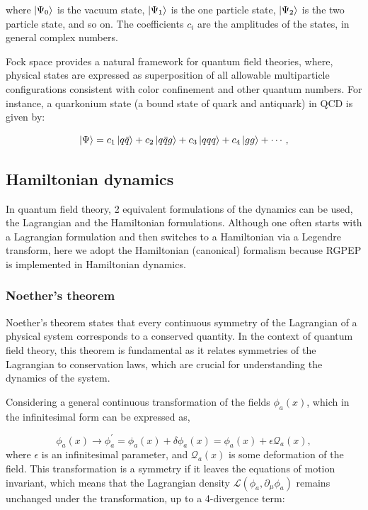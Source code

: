 \documentclass[11pt,a4paper,twoside,pdf]{article}
\numberwithin{equation}{section}
\begin{document}
where $\ket{\Psi_0}$ is the vacuum state, $\ket{\Psi_1}$ is the one particle
state, $\ket{\Psi_2}$ is the two particle state, and so on. The coefficients $c_i$
are the amplitudes of the states, in general complex numbers. 

Fock space provides a natural framework for quantum field theories, where, 
physical states are expressed as superposition of all allowable multiparticle 
configurations consistent with color confinement and other quantum numbers. 
For instance, a quarkonium state (a bound state of quark and antiquark) in QCD is 
given by:

\begin{equation}
    \ket{\Psi} = c_1 \ket{q\bar{q}} + c_2 \ket{q\bar{q}g} + c_3 \ket{qqq} 
    + c_4 \ket{gg} + \cdots,
\end{equation}

\subsection{Hamiltonian dynamics}

In quantum field theory, 2 equivalent formulations of the dynamics can be used, 
the Lagrangian and the Hamiltonian formulations. Although one often starts with a 
Lagrangian formulation and then switches to a Hamiltonian via a Legendre transform, 
here we adopt the Hamiltonian (canonical) formalism because RGPEP is implemented 
in Hamiltonian dynamics.

\subsubsection{Noether's theorem}

Noether's theorem \cite{Noether:1918zz} states that every continuous symmetry of the
Lagrangian of a physical system corresponds to a conserved quantity. In the context
of quantum field theory, this theorem is fundamental as it relates symmetries of the
Lagrangian to conservation laws, which are crucial for understanding the dynamics of
the system.

Considering a general continuous transformation of the fields \(\phi_a(x)\), 
which in the infinitesimal form can be expressed as,

\begin{equation}
    \phi_a(x) \to \phi^\prime_a = \phi_a(x) + \delta\phi_a(x) = \phi_a(x) + 
    \epsilon \mathcal{Q}_a(x),
\end{equation}
where \(\epsilon\) is an infinitesimal parameter, and \(\mathcal{Q}_a(x)\) is some 
deformation of the field. This transformation is a symmetry if it leaves the
equations of motion invariant, which means that the Lagrangian density
\(\mathcal{L}(\phi_a, \partial_\mu \phi_a)\) remains unchanged under the transformation,
up to a 4-divergence term:
\end{document}
